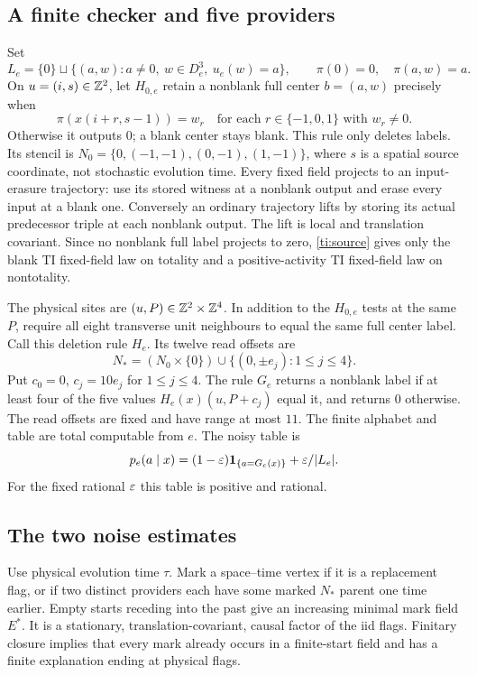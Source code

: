 \subsection{A finite checker and five providers}

Set
\[
 L_e=\{0\}\sqcup\{(a,w):a\ne0,\ w\in D_e^3,\ u_e(w)=a\},\qquad
 \pi(0)=0,\quad\pi(a,w)=a.
\]
On $u=(i,s)\in\mathbb{Z}^2$, let $H_{0,e}$ retain a nonblank full center $b=(a,w)$ precisely when
\[
 \pi(x(i+r,s-1))=w_r\quad\text{for each }r\in\{-1,0,1\}\text{ with }w_r\ne0.
\]
Otherwise it outputs $0$; a blank center stays blank. This rule only deletes labels. Its stencil is $N_0=\{0,(-1,-1),(0,-1),(1,-1)\}$, where $s$ is a spatial source coordinate, not stochastic evolution time. Every fixed field projects to an input-erasure trajectory: use its stored witness at a nonblank output and erase every input at a blank one. Conversely an ordinary trajectory lifts by storing its actual predecessor triple at each nonblank output. The lift is local and translation covariant. Since no nonblank full label projects to zero, \cref{ti:source} gives only the blank TI fixed-field law on totality and a positive-activity TI fixed-field law on nontotality.

The physical sites are $(u,P)\in\mathbb{Z}^2\times\mathbb{Z}^4$. In addition to the $H_{0,e}$ tests at the same $P$, require all eight transverse unit neighbours to equal the same full center label. Call this deletion rule $H_e$. Its twelve read offsets are
\[
 N_*=(N_0\times\{0\})\cup\{(0,\pm e_j):1\le j\le4\}.
\]
Put $c_0=0$, $c_j=10e_j$ for $1\le j\le4$. The rule $G_e$ returns a nonblank label if at least four of the five values $H_e(x)(u,P+c_j)$ equal it, and returns $0$ otherwise. The read offsets are fixed and have range at most $11$. The finite alphabet and table are total computable from $e$. The noisy table is
\[
 p_e(a\mid x)=(1-\varepsilon)\mathbf1_{\{a=G_e(x)\}}+\varepsilon/|L_e|.
\]
For the fixed rational $\varepsilon$ this table is positive and rational.

\subsection{The two noise estimates}

Use physical evolution time $\tau$. Mark a space--time vertex if it is a replacement flag, or if two distinct providers each have some marked $N_*$ parent one time earlier. Empty starts receding into the past give an increasing minimal mark field $E^*$. It is a stationary, translation-covariant, causal factor of the iid flags. Finitary closure implies that every mark already occurs in a finite-start field and has a finite explanation ending at physical flags.

